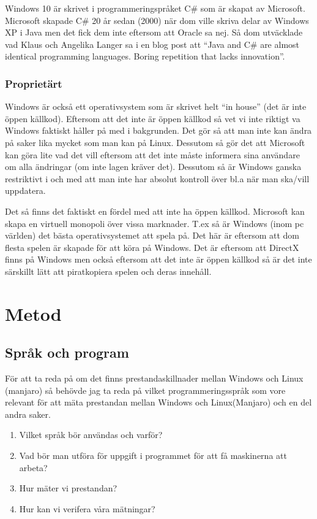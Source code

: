 \documentclass[12pt, a4paper]{report}
\begin{document}
    Windows 10 är skrivet i programmeringspråket C\# som är skapat av Microsoft\cite{c}. Microsoft skapade C\# 20 år sedan (2000) när dom ville skriva delar av Windows XP i Java men det fick dem inte eftersom att Oracle sa nej. Så dom utväcklade vad Klaus och Angelika Langer sa i en blog post att ``Java and C\# are almost identical programming languages. Boring repetition that lacks innovation''.\cite{cquote}  
    

    \subsubsection{Proprietärt}
    Windows är också ett operativsystem som är skrivet helt ``in house'' (det är inte öppen källkod).
    Eftersom att det inte är öppen källkod så vet vi inte riktigt va Windows faktiskt håller på med i bakgrunden. Det gör så att man inte kan ändra på saker lika mycket som man kan på Linux. Dessutom så gör det att Microsoft kan göra lite vad det vill eftersom att det inte måste informera sina användare om alla ändringar (om inte lagen kräver det). Dessutom så är Windows ganska restriktivt i och med att man inte har absolut kontroll över bl.a när man ska/vill uppdatera.


   Det så finns det faktiskt en fördel med att inte ha öppen källkod. Microsoft kan skapa en virtuell monopoli över vissa marknader. T.ex så är Windows (inom pc världen) det bästa operativsystemet att spela på. Det här är eftersom att dom flesta spelen är skapade för att köra på Windows. Det är eftersom att DirectX\cite{directx} finns på Windows men också eftersom att det inte är öppen källkod så är det inte särskillt lätt att piratkopiera spelen och deras innehåll.


 
\section{Metod}
 

\subsection{Språk och program}
 
För att ta reda på om det finns prestandaskillnader mellan Windows och Linux (manjaro) så behövde jag ta reda på vilket programmeringsspråk som vore relevant för att mäta prestandan mellan Windows och Linux(Manjaro) och en del andra saker.

\begin{enumerate}
   \item Vilket språk bör användas och varför?
   \item Vad bör man utföra för uppgift i programmet för att få maskinerna att arbeta?
   \item Hur mäter vi prestandan?
   \item Hur kan vi verifera våra mätningar?
\end{enumerate}
 
\end{document}
